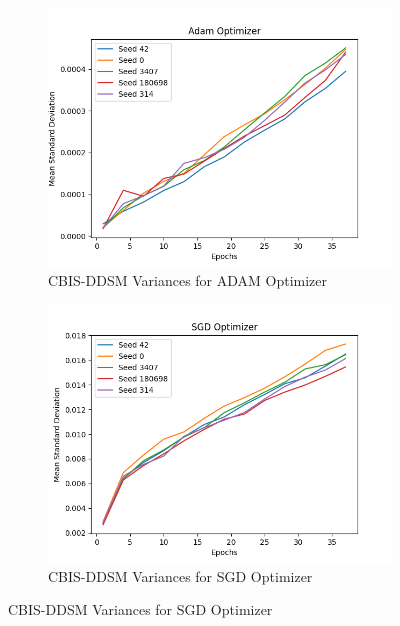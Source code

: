 \begin{figure}[h!]
      \begin{subfigure}[b]{0.45\textwidth}
        \includegraphics[width=\textwidth]{figures/mammo_adam_curvers_std.png}
        \caption{CBIS-DDSM Variances for ADAM Optimizer}
        \label{fig:cbisddsm_adam}
      \end{subfigure}
      \hfill
      \begin{subfigure}[b]{0.45\textwidth}
        \includegraphics[width=\textwidth]{figures/mammo_sgd_curves_std.png}
        \caption{CBIS-DDSM Variances for SGD Optimizer}
        \label{fig:cbisddsm_sgd}
      \end{subfigure}
      

\end{figure}
